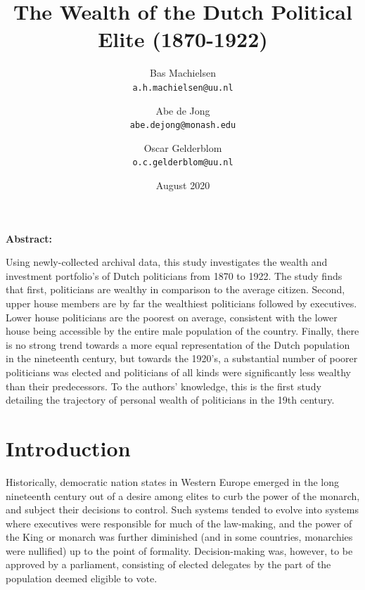 
\usepackage[utf8]{inputenc}

\title{The Wealth of the Dutch Political Elite (1870-1922)}
\author{
  Bas Machielsen\\
  \texttt{a.h.machielsen@uu.nl}
  \and
  Abe de Jong\\
  \texttt{abe.dejong@monash.edu}
  \and
  Oscar Gelderblom\\
  \texttt{o.c.gelderblom@uu.nl}
}

\date{August 2020}



\maketitle

\begin{center}
\textbf{Abstract:}
\end{center}
    Using newly-collected archival data, this study investigates the wealth and investment portfolio's of Dutch politicians from 1870 to 1922. The study finds that first, politicians are wealthy in comparison to the average citizen. Second, upper house members are by far the wealthiest politicians followed by executives. Lower house politicians are the poorest on average, consistent with the lower house being accessible by the entire male population of the country. Finally, there is no strong trend towards a more equal representation of the Dutch population in the nineteenth century, but towards the 1920's, a substantial number of poorer politicians was elected and politicians of all kinds were significantly less wealthy than their predecessors. To the authors' knowledge, this is the first study detailing the trajectory of personal wealth of politicians in the 19th century.
\clearpage

\section{Introduction}
    Historically, democratic nation states in Western Europe emerged in the long nineteenth century out of a desire among elites to curb the power of the monarch, and subject their decisions to control. Such systems tended to evolve into systems where executives were responsible for much of the law-making, and the power of the King or monarch was further diminished (and in some countries, monarchies were nullified) up to the point of formality. Decision-making was, however, to be approved by a parliament, consisting of elected delegates by the part of the population deemed eligible to vote. 


